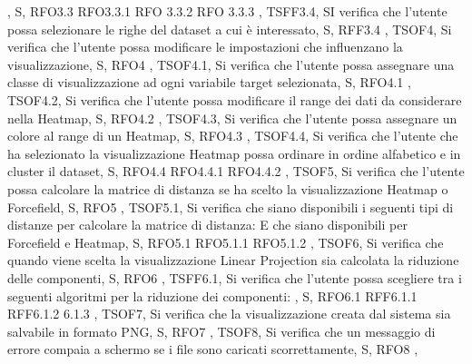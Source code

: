 {{        ,
        S,
        RFO3.3 RFO3.3.1 RFO 3.3.2 RFO 3.3.3
    },
    {   
        TSFF3.4,
        SI verifica che l'utente possa selezionare le righe del dataset a cui è interessato,
        S,
        RFF3.4
    },
    {   
        TSOF4,
        Si verifica che l'utente possa modificare le impostazioni che influenzano la visualizzazione,
        S,
        RFO4
    },
    {   
        TSOF4.1,
        Si verifica che l'utente possa assegnare una classe di visualizzazione ad ogni variabile target selezionata,
        S,
        RFO4.1
    },
    {   
        TSOF4.2,
        Si verifica che l'utente possa modificare il range dei dati da considerare nella Heatmap,
        S,
        RFO4.2
    },
    {   
        TSOF4.3,
        Si verifica che l'utente possa assegnare un colore al range di un Heatmap,
        S,
        RFO4.3
    },
    {   
        TSOF4.4,
        Si verifica che l'utente che ha selezionato la visualizzazione Heatmap possa ordinare in ordine alfabetico e in cluster il dataset,
        S,
        RFO4.4 RFO4.4.1 RFO4.4.2
    },
    {   
        TSOF5,
        Si verifica che l'utente possa calcolare la matrice di distanza se ha scelto la visualizzazione Heatmap o Forcefield,
        S,
        RFO5
    },    
    {   
        TSOF5.1,
        Si verifica che siano disponibili i seguenti tipi di distanze per calcolare la matrice di distanza:
        E che siano disponibili per Forcefield e Heatmap,
        S,
        RFO5.1 RFO5.1.1 RFO5.1.2
    },
    {   
        TSOF6,
        Si verifica che quando viene scelta la visualizzazione Linear Projection sia calcolata la riduzione delle componenti,
        S,
        RFO6
    },
    {   
        TSFF6.1,
        Si verifica che l'utente possa scegliere tra i seguenti algoritmi per la riduzione dei componenti:
        ,
        S,
        RFO6.1 RFF6.1.1 RFF6.1.2 6.1.3
    },
    {   
        TSOF7,
        Si verifica che la visualizzazione creata dal sistema sia salvabile in formato PNG,
        S,
        RFO7
    },
    {   
        TSOF8,
        Si verifica che un messaggio di errore compaia a schermo se i file sono caricati scorrettamente,
        S,
        RFO8
    },
    }
    
    
